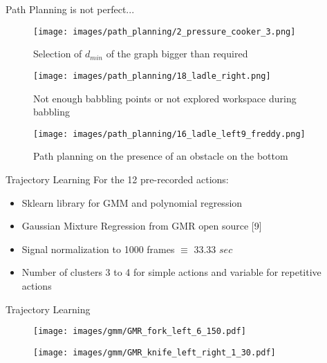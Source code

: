 \documentclass[aspectratio=169]{beamer}
\begin{document}
\begin{frame}{Path Planning is not perfect...}
		\begin{minipage}{0.32\linewidth}
			\centering	
		\begin{figure}[h!]
			\texttt{[image: images/path\_planning/2\_pressure\_cooker\_3.png]}
			\caption{Selection of $d_{min}$ of the graph bigger than required}
		\end{figure}
	\end{minipage}		
	\begin{minipage}{0.32\linewidth}
		\centering	
		\begin{figure}[h!]
			\texttt{[image: images/path\_planning/18\_ladle\_right.png]}
			\caption{Not enough babbling points or not explored workspace during babbling}
		\end{figure}
	\end{minipage}	
	\begin{minipage}{0.32\linewidth}	
	\begin{figure}[h!]
		\texttt{[image: images/path\_planning/16\_ladle\_left9\_freddy.png]}
		\caption{Path planning on the presence of an obstacle on the bottom}
	\end{figure}
	\end{minipage}
\end{frame}

\begin{frame}{Trajectory Learning}
	For the 12 pre-recorded actions:
	\newline
	\begin{itemize}
		\item Sklearn library for GMM and polynomial regression
		\newline
		\item Gaussian Mixture Regression from GMR open source [9]
		\newline
		\item Signal normalization to 1000 frames $\equiv$ 33.33 $sec$
		\newline
		\item Number of clusters 3 to 4 for simple actions and variable for repetitive actions
		
	\end{itemize}
	
\end{frame}

\begin{frame}{Trajectory Learning}
	\begin{minipage}{0.49\linewidth}
		\centering	
		\begin{figure}[h!]
			\texttt{[image: images/gmm/GMR\_fork\_left\_6\_150.pdf]}
		\end{figure}
	\end{minipage}		
	\begin{minipage}{0.49\linewidth}
		\centering	
		\begin{figure}[h!]
			\texttt{[image: images/gmm/GMR\_knife\_left\_right\_1\_30.pdf]}
		\end{figure}	
	\end{minipage}	
\end{frame}
\end{document}
